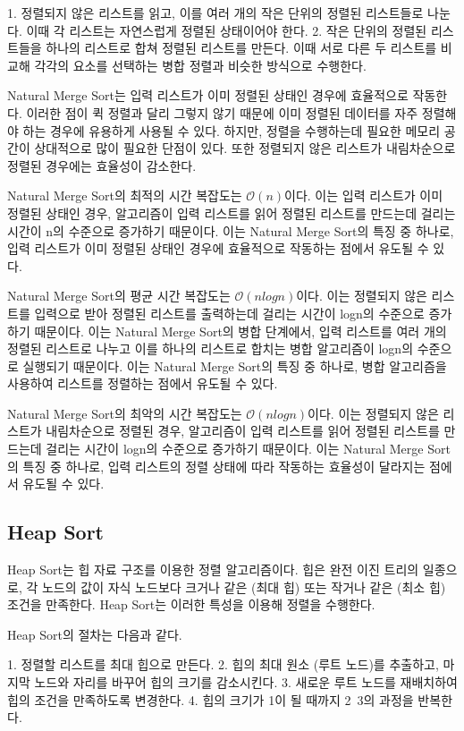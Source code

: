 \documentclass{article}
\begin{document}
1. 정렬되지 않은 리스트를 읽고, 이를 여러 개의 작은 단위의 정렬된 리스트들로 나눈다. 이때 각 리스트는 자연스럽게 정렬된 상태이어야 한다.
2. 작은 단위의 정렬된 리스트들을 하나의 리스트로 합쳐 정렬된 리스트를 만든다. 이때 서로 다른 두 리스트를 비교해 각각의 요소를 선택하는 병합 정렬과 비슷한 방식으로 수행한다.

Natural Merge Sort는 입력 리스트가 이미 정렬된 상태인 경우에 효율적으로 작동한다. 이러한 점이 퀵 정렬과 달리 그렇지 않기 때문에 이미 정렬된 데이터를 자주 정렬해야 하는 경우에 유용하게 사용될 수 있다. 하지만, 정렬을 수행하는데 필요한 메모리 공간이 상대적으로 많이 필요한 단점이 있다. 또한 정렬되지 않은 리스트가 내림차순으로 정렬된 경우에는 효율성이 감소한다.

Natural Merge Sort의 최적의 시간 복잡도는 $\mathcal{O}(n)$이다. 이는 입력 리스트가 이미 정렬된 상태인 경우, 알고리즘이 입력 리스트를 읽어 정렬된 리스트를 만드는데 걸리는 시간이 n의 수준으로 증가하기 때문이다. 이는 Natural Merge Sort의 특징 중 하나로, 입력 리스트가 이미 정렬된 상태인 경우에 효율적으로 작동하는 점에서 유도될 수 있다.

Natural Merge Sort의 평균 시간 복잡도는 $\mathcal{O}(nlogn)$이다. 이는 정렬되지 않은 리스트를 입력으로 받아 정렬된 리스트를 출력하는데 걸리는 시간이 logn의 수준으로 증가하기 때문이다. 이는 Natural Merge Sort의 병합 단계에서, 입력 리스트를 여러 개의 정렬된 리스트로 나누고 이를 하나의 리스트로 합치는 병합 알고리즘이 logn의 수준으로 실행되기 때문이다. 이는 Natural Merge Sort의 특징 중 하나로, 병합 알고리즘을 사용하여 리스트를 정렬하는 점에서 유도될 수 있다.

Natural Merge Sort의 최악의 시간 복잡도는 $\mathcal{O}(nlogn)$이다. 이는 정렬되지 않은 리스트가 내림차순으로 정렬된 경우, 알고리즘이 입력 리스트를 읽어 정렬된 리스트를 만드는데 걸리는 시간이 logn의 수준으로 증가하기 때문이다. 이는 Natural Merge Sort의 특징 중 하나로, 입력 리스트의 정렬 상태에 따라 작동하는 효율성이 달라지는 점에서 유도될 수 있다.

\subsection{Heap Sort}
Heap Sort는 힙 자료 구조를 이용한 정렬 알고리즘이다. 힙은 완전 이진 트리의 일종으로, 각 노드의 값이 자식 노드보다 크거나 같은 (최대 힙) 또는 작거나 같은 (최소 힙) 조건을 만족한다. Heap Sort는 이러한 특성을 이용해 정렬을 수행한다.

Heap Sort의 절차는 다음과 같다.

1. 정렬할 리스트를 최대 힙으로 만든다.
2. 힙의 최대 원소 (루트 노드)를 추출하고, 마지막 노드와 자리를 바꾸어 힙의 크기를 감소시킨다.
3. 새로운 루트 노드를 재배치하여 힙의 조건을 만족하도록 변경한다.
4. 힙의 크기가 1이 될 때까지 2~3의 과정을 반복한다.
\end{document}
